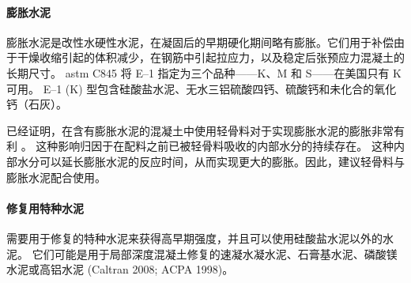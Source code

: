 \paragraph{膨胀水泥}
膨胀水泥是改性水硬性水泥，在凝固后的早期硬化期间略有膨胀。它们用于补偿由于干燥收缩引起的体积减少，在钢筋中引起拉应力，以及稳定后张预应力混凝土的长期尺寸。 \acrshort*{astm} C845 将 E--1 指定为三个品种——K、M 和 S——在美国只有 K 可用。 E--1 (K) 型包含硅酸盐水泥、无水三铝硫酸四钙、硫酸钙和未化合的氧化钙（石灰）。

已经证明，在含有膨胀水泥的混凝土中使用轻骨料对于实现膨胀水泥的膨胀非常有利 \cite{russell1978p}。 这种影响归因于在配料之前已被轻骨料吸收的内部水分的持续存在。 这种内部水分可以延长膨胀水泥的反应时间，从而实现更大的膨胀。因此，建议轻骨料与膨胀水泥配合使用。

\paragraph{修复用特种水泥}
需要用于修复的特种水泥来获得高早期强度，并且可以使用硅酸盐水泥以外的水泥。 它们可能是用于局部深度混凝土修复的速凝水凝水泥、石膏基水泥、磷酸镁水泥或高铝水泥 (Caltran 2008; ACPA 1998)。


